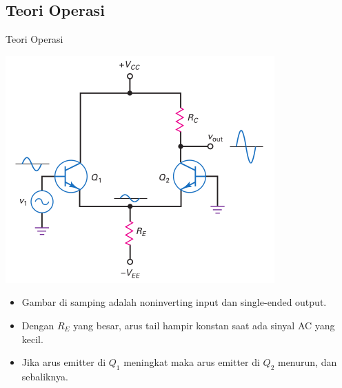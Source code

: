 \documentclass[aspectratio=169]{beamer}
\begin{document}
\subsection{Teori Operasi}
\begin{frame}{Teori Operasi}
	\begin{multicols}{2}
		\begin{center}
			\includegraphics[height=0.7\textheight]{gambar/01.diff-amp/01.noninverting-input+single-ended-output_AC}
		\end{center}
		\columnbreak
		\begin{itemize}
			\item Gambar di samping adalah noninverting input dan single-ended output.
			\item Dengan $ R_E $ yang besar, arus tail hampir konstan saat ada sinyal AC yang kecil.
			\item Jika arus emitter di $ Q_1 $ meningkat maka arus emitter di  $ Q_2 $ menurun, dan sebaliknya.
		\end{itemize}
	\end{multicols}
\end{frame}
\end{document}
